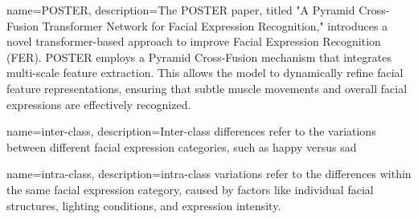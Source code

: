  

{
    name=POSTER,
    description={The POSTER paper, titled "A Pyramid Cross-Fusion Transformer Network for Facial Expression Recognition," introduces a novel transformer-based approach to improve Facial Expression Recognition (FER). POSTER employs a Pyramid Cross-Fusion mechanism that integrates multi-scale feature extraction. This allows the model to dynamically refine facial feature representations, ensuring that subtle muscle movements and overall facial expressions are effectively recognized.}
}

{
    name=inter-class,
    description={Inter-class differences refer to the variations between different facial expression categories, such as happy versus sad}
}


{
    name=intra-class,
    description={intra-class variations refer to the differences within the same facial expression category, caused by factors like individual facial structures, lighting conditions, and expression intensity.}
}